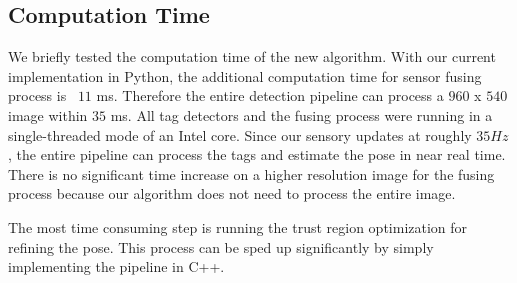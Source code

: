 \subsection{Computation Time}
We briefly tested the computation time of the new algorithm. With our current implementation in Python, the additional computation time for sensor fusing process is ~$11$ ms. Therefore the entire detection pipeline can process a $960$ x $540$ image within $35$ ms. All tag detectors and the fusing process were running in a single-threaded mode of an Intel core. Since our sensory updates at roughly $35Hz$, the entire pipeline can process the tags and estimate the pose in near real time. There is no significant time increase on a higher resolution image for the fusing process because our algorithm does not need to process the entire image.

The most time consuming step is running the trust region optimization for refining the pose. This process can be sped up significantly by simply implementing the pipeline in C++.